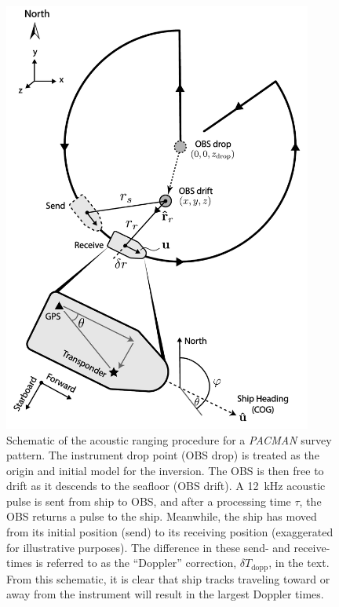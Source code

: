 \documentclass[10pt,titlepage]{article}
\begin{document}
\newpage
\begin{figure}[h]
\begin{center}
\includegraphics[trim=0cm 0cm 0cm 0cm,clip=true,width=4in]{cartoon_v2.pdf}
\caption{Schematic of the acoustic ranging procedure for a \textit{PACMAN} survey pattern. The instrument drop point (OBS drop) is treated as the origin and initial model for the inversion. The OBS is then free to drift as it descends to the seafloor (OBS drift). A 12~kHz acoustic pulse is sent from ship to OBS, and after a processing time $\tau$, the OBS returns a pulse to the ship. Meanwhile, the ship has moved from its initial position (send) to its receiving position (exaggerated for illustrative purposes). The difference in these send- and receive-times is referred to as the ``Doppler'' correction, $\delta T_{\text{dopp}}$, in the text. From this schematic, it is clear that ship tracks traveling toward or away from the instrument will result in the largest Doppler times.}
\label{fig:cartoon}
\end{center}
\end{figure}
\end{document}
